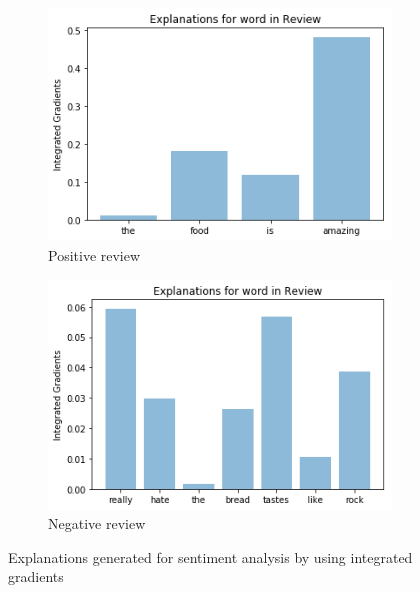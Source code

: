 \begin{figure}[t]
	\centering
	\begin{subfigure}{0.45\textwidth}
		\centering
		\includegraphics[width=\linewidth]{figure2}
		\caption{Positive review}
		\label{fig:sa:int-grad:pos}
	\end{subfigure} %
	\begin{subfigure}{0.45\textwidth}
		\centering
		\includegraphics[width=\linewidth]{figure3}
		\caption{Negative review}
		\label{fig:sa:int-grad:neg}
	\end{subfigure}
	\caption{Explanations generated for sentiment analysis by using integrated gradients}
	\label{fig:sa:int-grad}
\end{figure}

